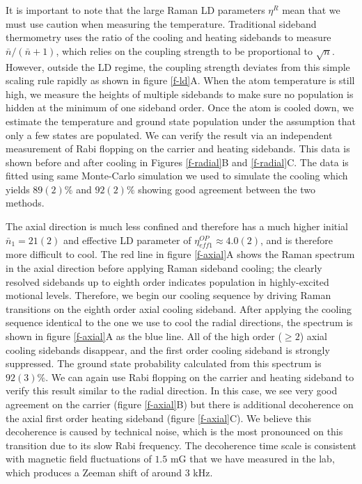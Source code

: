 \documentclass[aps,prl,twocolumn,groupedaddress]{revtex4-1}
\begin{document}
It is important to note that the large Raman LD parameters $\eta^R$ mean that
we must use caution when measuring the temperature.
Traditional sideband thermometry uses
the ratio of the cooling and heating sidebands to measure $\bar n / (\bar n + 1)$, which relies
on the coupling strength to be proportional to $\sqrt{n}$. However, outside the
LD regime, the coupling strength deviates from this simple scaling rule rapidly as
shown in figure \ref{f-ld}A.
When the atom temperature is still high,
we measure the heights of multiple sidebands to make sure no population is hidden at the
minimum of one sideband order. Once the atom is cooled down, we estimate the temperature
and ground state population under the assumption that only a few states are populated.
We can verify the result via an independent measurement of Rabi flopping on the carrier and
heating sidebands\cite{Meekhof1996}. This data is shown before and after cooling in Figures
\ref{f-radial}B and \ref{f-radial}C.
The data is fitted using same Monte-Carlo simulation we used to simulate the cooling
which yields $89(2)\%$ and $92(2)\%$ showing good agreement between the two methods.

The axial direction is much less confined and therefore has a much higher initial
$\bar n_1=21(2)$ and effective LD parameter of $\eta^{OP}_{eff1}\approx 4.0(2)$,
and is therefore more difficult to cool.
The red line in figure \ref{f-axial}A shows the Raman spectrum in the axial direction
before applying Raman sideband cooling; the clearly resolved sidebands
up to eighth order indicates population in highly-excited motional levels.
Therefore, we begin our cooling sequence by driving Raman transitions on the eighth order axial
cooling sideband. After applying the cooling sequence identical to the one we use to cool
the radial directions, the spectrum is shown in figure \ref{f-axial}A as the blue line.
All of the high order ($\geqslant2$) axial cooling sidebands disappear, and the first order
cooling sideband is strongly suppressed.
The ground state probability calculated from this spectrum is $92(3)\%$.
We can again use Rabi flopping on the carrier and heating sideband to verify this result
similar to the radial direction. In this case, we see very good agreement on the carrier
(figure \ref{f-axial}B) but there is additional decoherence on the axial first order
heating sideband (figure \ref{f-axial}C).
We believe this decoherence is caused by technical noise, which is the most pronounced
on this transition due to its slow Rabi frequency.
The decoherence time scale is consistent with magnetic field fluctuations of $1.5$ mG that we have measured in the lab, which produces
a Zeeman shift of around $3$ kHz.
\end{document}
